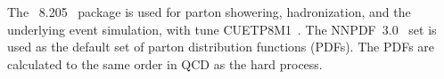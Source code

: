 The \PYTHIA~8.205~\cite{Sjostrand:2015} package is used  for parton showering, hadronization, and the underlying event simulation, with tune CUETP8M1~\cite{Skands:2014pea,Khachatryan:2015pea}. The NNPDF~3.0~\cite{nnpdf} set is used as the default set of parton distribution functions (PDFs). The PDFs are calculated to the same order in QCD as the hard process. 
